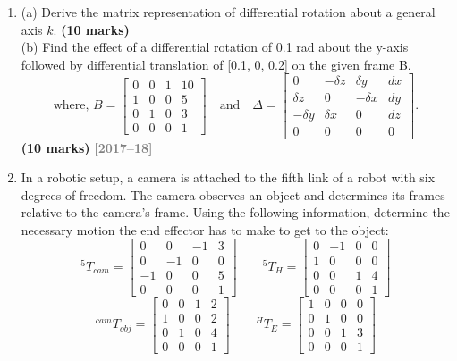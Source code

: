 \documentclass[12pt,a3paper]{article}
\newcommand{\yr}[1]{\hfill\textcolor{gray}{\small\textbf{[#1]}}}
\newcommand{\mk}[1]{\textcolor{orange!70!black}{\small\textbf{(#1 marks)}}}
\begin{document}
\begin{enumerate}
\item \label{qlabel:C2-Q5}
(a) Derive the matrix representation of differential rotation about a
general axis $k$. \mk{10}\\
(b) Find the effect of a differential rotation of 0.1 rad about the y-axis followed by differential translation of [0.1, 0, 0.2] on the given frame B.
\[
  \text{where, } B = 
  \begin{bmatrix} 
    0 & 0 & 1 & 10 \\ 
    1 & 0 & 0 & 5 \\ 
    0 & 1 & 0 & 3 \\ 
    0 & 0 & 0 & 1 
  \end{bmatrix} 
  \quad \text{and} \quad 
  \Delta = 
  \begin{bmatrix} 
    0 & -\delta z & \delta y & dx \\ 
    \delta z & 0 & -\delta x & dy \\ 
    -\delta y & \delta x & 0 & dz \\ 
    0 & 0 & 0 & 0 
  \end{bmatrix}.
\]
\mk{10}
\yr{2017--18}




\item \label{qlabel:C2-Q4}
In a robotic setup, a camera is attached to the fifth link of a robot with six degrees of freedom. The camera observes an object and determines its frames relative to the camera's frame. Using the following information, determine the necessary motion the end effector has to make to get to the object:
\[
  {}^5T_{cam} = \begin{bmatrix}
    0 & 0 & -1 & 3 \\
    0 & -1 & 0 & 0 \\
    -1 & 0 & 0 & 5 \\
    0 & 0 & 0 & 1
  \end{bmatrix} \qquad
  {}^5T_H = \begin{bmatrix}
    0 & -1 & 0 & 0 \\
    1 & 0 & 0 & 0 \\
    0 & 0 & 1 & 4 \\
    0 & 0 & 0 & 1
  \end{bmatrix}
\]
\[
  {}^{cam}T_{obj} = \begin{bmatrix}
    0 & 0 & 1 & 2 \\
    1 & 0 & 0 & 2 \\
    0 & 1 & 0 & 4 \\
    0 & 0 & 0 & 1
  \end{bmatrix} \qquad
  {}^HT_E = \begin{bmatrix}
    1 & 0 & 0 & 0 \\
    0 & 1 & 0 & 0 \\
    0 & 0 & 1 & 3 \\
    0 & 0 & 0 & 1
  \end{bmatrix}
\]





\end{enumerate}
\end{document}
